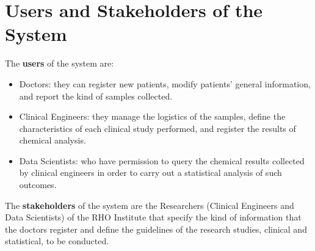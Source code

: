 \section{Users and Stakeholders of the System}
The \textbf{users} of the system are:
\begin{itemize}
    \item Doctors: they can register new patients, modify patients' general information, and report the kind of samples collected.
    \item Clinical Engineers: they manage the logistics of the samples, define the characteristics of each clinical study performed, and register the results of chemical analysis.
    \item Data Scientists: who have permission to query the chemical results collected by clinical engineers in order to carry out a statistical analysis of such outcomes. 
\end{itemize}

The \textbf{stakeholders} of the system are the Researchers (Clinical Engineers and Data Scientists) of the RHO Institute that specify the kind of information that the doctors register and define the guidelines of the research studies, clinical and statistical, to be conducted.